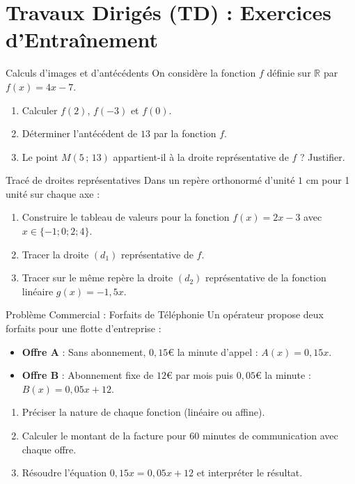 \section{Travaux Dirigés (TD) : Exercices d'Entraînement}

\begin{exercice}[3 pts]{\capRealiser}{Calculs d'images et d'antécédents}
On considère la fonction $f$ définie sur $\mathbb{R}$ par $f(x) = 4x - 7$.
\begin{enumerate}
    \item Calculer $f(2)$, $f(-3)$ et $f(0)$.
    \item Déterminer l'antécédent de $13$ par la fonction $f$.
    \item Le point $M(5\,;\,13)$ appartient-il à la droite représentative de $f$ ? Justifier.
\end{enumerate}
\lignesreponse[5]
\end{exercice}

\begin{exercice}[4 pts]{\capRealiser}{Tracé de droites représentatives}
Dans un repère orthonormé d'unité $1\text{ cm}$ pour 1 unité sur chaque axe :
\begin{enumerate}
    \item Construire le tableau de valeurs pour la fonction $f(x) = 2x - 3$ avec $x \in \{-1 ; 0 ; 2 ; 4\}$.
    \item Tracer la droite $(d_1)$ représentative de $f$.
    \item Tracer sur le même repère la droite $(d_2)$ représentative de la fonction linéaire $g(x) = -1{,}5x$.
\end{enumerate}
\quadrillage[4.5cm]
\end{exercice}

\begin{exercice}[4 pts]{\capAnalyser}{Problème Commercial : Forfaits de Téléphonie}
Un opérateur propose deux forfaits pour une flotte d'entreprise :
\begin{itemize}
    \item \textbf{Offre A} : Sans abonnement, $0{,}15\euro$ la minute d'appel : $A(x) = 0{,}15x$.
    \item \textbf{Offre B} : Abonnement fixe de $12\euro$ par mois puis $0{,}05\euro$ la minute : $B(x) = 0{,}05x + 12$.
\end{itemize}
\begin{enumerate}
    \item Préciser la nature de chaque fonction (linéaire ou affine).
    \item Calculer le montant de la facture pour 60 minutes de communication avec chaque offre.
    \item Résoudre l'équation $0{,}15x = 0{,}05x + 12$ et interpréter le résultat.
\end{enumerate}
\lignesreponse[5]
\end{exercice}

